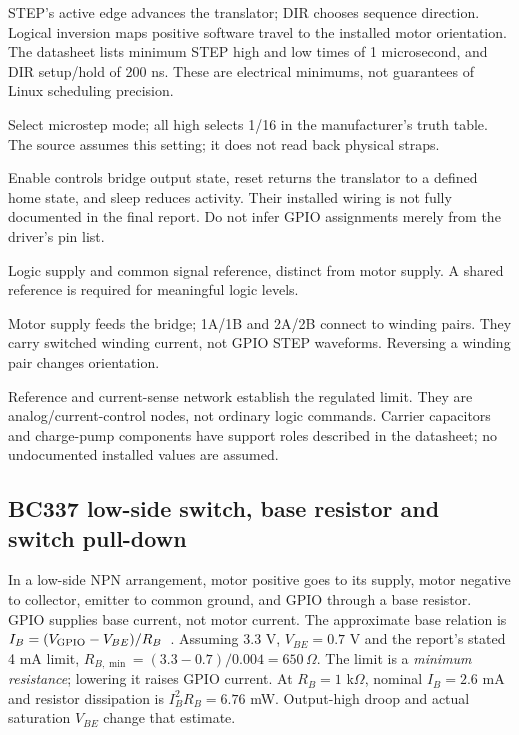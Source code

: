 \begin{description}[style=nextline]
\item[STEP and DIR.] STEP's active edge advances the translator; DIR chooses
sequence direction. Logical inversion maps positive software travel to the
installed motor orientation. The datasheet lists minimum STEP high and low
times of 1 microsecond, and DIR setup/hold of 200 ns. These are electrical
minimums, not guarantees of Linux scheduling precision.
\item[MS1, MS2, MS3.] Select microstep mode; all high selects 1/16 in the
manufacturer's truth table. The source assumes this setting; it does not
read back physical straps.
\item[ENABLE, RESET, SLEEP.] Enable controls bridge output state, reset returns
the translator to a defined home state, and sleep reduces activity. Their
installed wiring is not fully documented in the final report. Do not infer
GPIO assignments merely from the driver's pin list.
\item[VDD and GND.] Logic supply and common signal reference, distinct from
motor supply. A shared reference is required for meaningful logic levels.
\item[VMOT / VBB and winding outputs.] Motor supply feeds the bridge;
1A/1B and 2A/2B connect to winding pairs. They carry switched winding
current, not GPIO STEP waveforms. Reversing a winding pair changes orientation.
\item[VREF and SENSE.] Reference and current-sense network establish the
regulated limit. They are analog/current-control nodes, not ordinary
logic commands. Carrier capacitors and charge-pump components have support
roles described in the datasheet; no undocumented installed values are assumed.
\end{description}

\subsection{BC337 low-side switch, base resistor and switch pull-down}
In a low-side NPN arrangement, motor positive goes to its supply, motor
negative to collector, emitter to common ground, and GPIO through a base
resistor. GPIO supplies base current, not motor current. The approximate
base relation is $I_B=(V_{\rm GPIO}-V_{BE})/R_B$~\cite{rohmnpn}.
Assuming 3.3 V, $V_{BE}=0.7$ V and the report's stated 4 mA limit,
$R_{B,\min}=(3.3-0.7)/0.004=650\,\Omega$.
The limit is a \emph{minimum resistance}; lowering it raises GPIO current.
At $R_B=1$ k$\Omega$, nominal $I_B=2.6$ mA and resistor dissipation is
$I_B^2R_B=6.76$ mW. Output-high droop and actual saturation $V_{BE}$
change that estimate.

